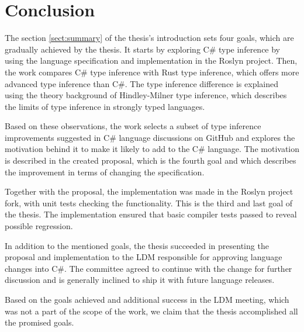 \chapter*{Conclusion}

The section \ref{sect:summary} of the thesis's introduction sets four goals, which are gradually achieved by the thesis. 
It starts by exploring C\# type inference by using the language specification and implementation in the Roslyn project. 
Then, the work compares C\# type inference with Rust type inference, which offers more advanced type inference than C\#. 
The type inference difference is explained using the theory background of Hindley-Milner type inference, which describes the limits of type inference in strongly typed languages.
\par
Based on these observations, the work selects a subset of type inference improvements suggested in C\# language discussions on GitHub and explores the motivation behind it to make it likely to add to the C\# language. 
The motivation is described in the created proposal, which is the fourth goal and which describes the improvement in terms of changing the specification.
\par
Together with the proposal, the implementation was made in the Roslyn project fork, with unit tests checking the functionality. 
This is the third and last goal of the thesis. 
The implementation ensured that basic compiler tests passed to reveal possible regression.
\par
In addition to the mentioned goals, the thesis succeeded in presenting the proposal and implementation to the LDM responsible for approving language changes into C\#. 
The committee agreed to continue with the change for further discussion and is generally inclined to ship it with future language releases.
\par
Based on the goals achieved and additional success in the LDM meeting, which was not a part of the scope of the work, we claim that the thesis accomplished all the promised goals.
